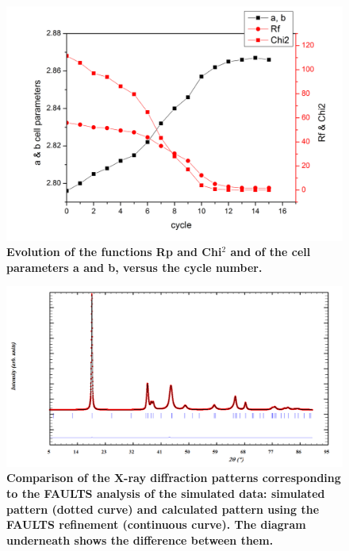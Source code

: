 \begin{figure}[!htbp]
\begin{center}
\includegraphics [width=4 in]{Rp_Chi2_ab_grafika_2.jpg}
\caption{\bf Evolution of the functions Rp and Chi$^{2}$ and of the cell parameters a and b, versus the cycle number. }
\label{cycles}
\end{center}
\end{figure}

\begin{figure}
\begin{center}
\includegraphics [width=6 in]{pattern.png}
\caption{\bf Comparison of the X-ray diffraction patterns corresponding to the FAULTS analysis of the simulated data: simulated pattern (dotted curve) and calculated pattern using the FAULTS refinement (continuous curve). The diagram underneath shows the difference between them.  }
\label{sim}
\end{center}
\end{figure}
